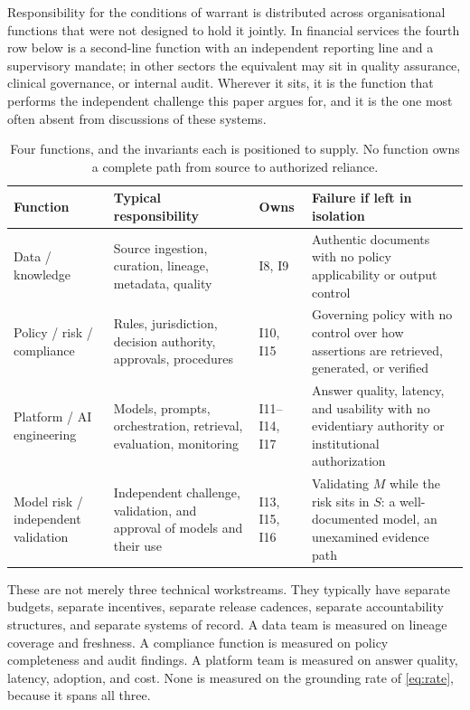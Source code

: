 \documentclass[11pt]{article}
\theoremstyle{plain}
\theoremstyle{definition}
\begin{document}
Responsibility for the conditions of warrant is distributed across organisational
functions that were not designed to hold it jointly. In financial services the fourth
row below is a second-line function with an independent reporting line and a
supervisory mandate; in other sectors the equivalent may sit in quality assurance,
clinical governance, or internal audit. Wherever it sits, it is the function that
performs the independent challenge this paper argues for, and it is the one most often
absent from discussions of these systems.

\begin{table}[ht]
  \centering
  \small
  \begin{tabular}{@{}>{\raggedright\arraybackslash}p{2.8cm}>{\raggedright\arraybackslash}p{4.6cm}>{\raggedright\arraybackslash}p{2.4cm}>{\raggedright\arraybackslash}p{4.0cm}@{}}
    \toprule
    Function & Typical responsibility & Owns & Failure if left in isolation \\
    \midrule
    Data / knowledge
      & Source ingestion, curation, lineage, metadata, quality
      & I8, I9
      & Authentic documents with no policy applicability or output control \\
    \addlinespace
    Policy / risk / compliance
      & Rules, jurisdiction, decision authority, approvals, procedures
      & I10, I15
      & Governing policy with no control over how assertions are retrieved,
        generated, or verified \\
    \addlinespace
    Platform / AI engineering
      & Models, prompts, orchestration, retrieval, evaluation, monitoring
      & I11--I14, I17
      & Answer quality, latency, and usability with no evidentiary authority or
        institutional authorization \\
    \addlinespace
    Model risk / independent validation
      & Independent challenge, validation, and approval of models and their use
      & I13, I15, I16
      & Validating $M$ while the risk sits in $S$: a well-documented model, an
        unexamined evidence path \\
    \bottomrule
  \end{tabular}
  \caption{Four functions, and the invariants each is positioned to supply. No
    function owns a complete path from source to authorized reliance.}
  \label{tab:three-teams}
\end{table}

These are not merely three technical workstreams. They typically have separate
budgets, separate incentives, separate release cadences, separate accountability
structures, and separate systems of record. A data team is measured on lineage
coverage and freshness. A compliance function is measured on policy completeness
and audit findings. A platform team is measured on answer quality, latency,
adoption, and cost. None is measured on the grounding rate of
\eqref{eq:rate}, because it spans all three.
\end{document}
